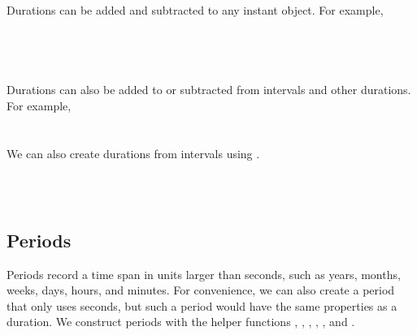 \documentclass[article]{jss}
\begin{document}
\\
\\

\\
\\

\\
\\

\\
\\
\\

Durations can be added and subtracted to any instant object. For example,\\

\\
\\

\\
\\

Durations can also be added to or subtracted from intervals and other durations. For example,\\

\\
\\

We can also create durations from intervals using . 

\\
\\


\subsection{Periods}
\label{sec:periods}

Periods record a time span in units larger than seconds, such as years, months, weeks, days, hours, and minutes. For convenience, we can also create a period that only uses seconds, but such a period would have the same properties as a duration. We construct periods with the helper functions , , , , , and  .\\
\end{document}
